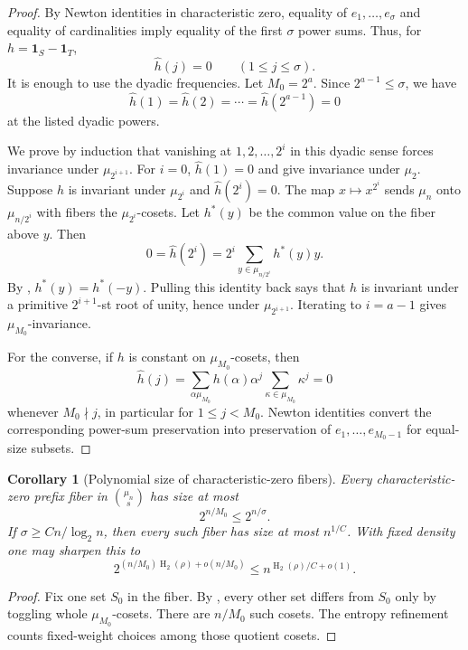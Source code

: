 \documentclass[11pt]{article}
\newtheorem{corollary}[corollary]{Corollary}
\theoremstyle{definition}
\newcommand{\HH}{\operatorname{H}_2}
\begin{document}
\begin{proof}
By Newton identities in characteristic zero, equality of $e_1,\ldots,e_\sigma$ and equality of cardinalities imply equality of the first $\sigma$ power sums.  Thus, for $h=\mathbf 1_S-\mathbf 1_T$,
\[
        \widehat h(j)=0\qquad(1\le j\le\sigma).
\]
It is enough to use the dyadic frequencies.  Let $M_0=2^a$.  Since $2^{a-1}\le\sigma$, we have
\[
        \widehat h(1)=\widehat h(2)=\cdots=\widehat h(2^{a-1})=0
\]
at the listed dyadic powers.

We prove by induction that vanishing at $1,2,\ldots,2^i$ in this dyadic sense forces invariance under $\mu_{2^{i+1}}$.  For $i=0$, $\widehat h(1)=0$ and  give invariance under $\mu_2$.  Suppose $h$ is invariant under $\mu_{2^i}$ and $\widehat h(2^i)=0$.  The map $x\mapsto x^{2^i}$ sends $\mu_n$ onto $\mu_{n/2^i}$ with fibers the $\mu_{2^i}$-cosets.  Let $h^\ast(y)$ be the common value on the fiber above $y$.  Then
\[
        0=\widehat h(2^i)=2^i\sum_{y\in\mu_{n/2^i}}h^\ast(y)y.
\]
By , $h^\ast(y)=h^\ast(-y)$.  Pulling this identity back says that $h$ is invariant under a primitive $2^{i+1}$-st root of unity, hence under $\mu_{2^{i+1}}$.  Iterating to $i=a-1$ gives $\mu_{M_0}$-invariance.

For the converse, if $h$ is constant on $\mu_{M_0}$-cosets, then
\[
        \widehat h(j)=\sum_{\alpha\mu_{M_0}}h(\alpha)\alpha^j\sum_{\kappa\in\mu_{M_0}}\kappa^j=0
\]
whenever $M_0\nmid j$, in particular for $1\le j<M_0$.  Newton identities convert the corresponding power-sum preservation into preservation of $e_1,\ldots,e_{M_0-1}$ for equal-size subsets.
\end{proof}

\begin{corollary}[Polynomial size of characteristic-zero fibers]\label{cor:upstairs-poly}
Every characteristic-zero prefix fiber in $\binom{\mu_n}{s}$ has size at most
\[
        2^{n/M_0}\le 2^{n/\sigma}.
\]
If $\sigma\ge Cn/\log_2n$, then every such fiber has size at most $n^{1/C}$.  With fixed density one may sharpen this to
\[
        2^{(n/M_0)\HH(\rho)+o(n/M_0)}\le n^{\HH(\rho)/C+o(1)}.
\]
\end{corollary}

\begin{proof}
Fix one set $S_0$ in the fiber.  By , every other set differs from $S_0$ only by toggling whole $\mu_{M_0}$-cosets.  There are $n/M_0$ such cosets.  The entropy refinement counts fixed-weight choices among those quotient cosets.
\end{proof}
\end{document}
